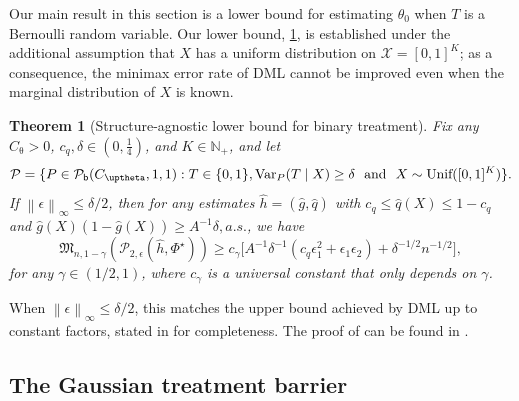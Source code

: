 \documentclass{article}
\def\eps{{\epsilon}}
\def\gP{{\mathcal{P}}}
\def\gX{{\mathcal{X}}}
\newcommand{\sstext}[1]{\ \ \text{#1}\ \ }
\newcommand{\infnorm}[1]{\norm{#1}_{\infty}} %
\def\naturals{\mathbb{N}} %
\newcommand{\Unif}{\textnormal{Unif}}
\newtheorem{theorem}{Theorem}[section]
\newcommand{\norm}[1]{\left\| #1 \right\|}
\begin{document}
%

%

%
%
%
%
%
%

%
%

%
%

Our main result in this section is a lower bound for estimating $\theta_0$ when $T$ is a Bernoulli random variable. Our lower bound, \cref{thm:binary-lower-bound}, is established under the additional assumption that $X$ has a uniform distribution on $\gX=[0,1]^K$; as a consequence, the minimax error rate of DML cannot be improved even when the marginal distribution of $X$ is known. 

\begin{theorem}[Structure-agnostic lower bound for binary treatment]
\label{thm:binary-lower-bound}
    Fix any $C_{\uptheta}>0$,   $c_q,\delta\in(0,\frac{1}{4})$, and $K\in\naturals_+$, and let 
    \begin{align}
    \gP = \{P\in\gP_{\mathsf{b}}(C_{\uptheta},1,1): T\in\{0,1\}, \mathrm{Var}_P(T\mid X)\geq \delta \sstext{and} X\sim \Unif([0,1]^K)\}.    
    \end{align} %
    If  $\infnorm{\eps}\leq \delta/2$, then for any estimates $\hat{h}=(\hat{g},\hat{q})$ with $c_q \leq \hat{q}(X)\leq 1-c_q$ and $\hat{g}(X)(1-\hat{g}(X))\geq A^{-1}\delta, a.s.$, we have 
    \begin{equation}
        \label{eq:binary-lower-bound}
        \mathfrak{M}_{n,1-\gamma}\left(\gP_{2,\eps}(\hat{h},\Phi^{\star})\right) \geq c_{\gamma} \Big[ A^{-1} \delta^{-1}(c_q\eps_1^2+\eps_1\eps_2) + \delta^{-1/2} n^{-1/2} \Big],
    \end{equation}
    for any $\gamma\in(1/2,1)$, where $c_\gamma$ is a universal constant that only depends on $\gamma$.
\end{theorem}

When $\infnorm{\eps}\leq \delta/2$, this  matches the upper bound achieved by DML up to constant factors, stated in  for completeness. The proof of  can be found in .

%



%



%

%


\subsection{The Gaussian treatment barrier}
\label{sec:gaussian-barrier}
\end{document}
